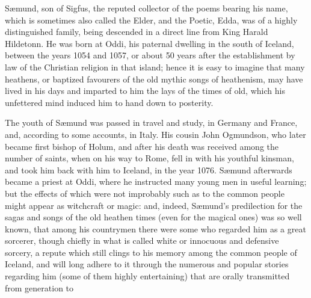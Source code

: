 

Sæmund, son of Sigfus, the reputed collector of the poems bearing his
name, which is sometimes also called the Elder, and the Poetic, Edda,
was of a highly distinguished family, being descended in a direct line
from King Harald Hildetonn. He was born at Oddi, his paternal dwelling
in the south of Iceland, between the years 1054 and 1057, or about 50
years after the establishment by law of the Christian religion in that
island; hence it is easy to imagine that many heathens, or baptized
favourers of the old mythic songs of heathenism, may have lived in his
days and imparted to him the lays of the times of old, which his
unfettered mind induced him to hand down to posterity.

The youth of Sæmund was passed in travel and study, in Germany and
France, and, according to some accounts, in Italy. His cousin John
Ogmundson, who later became first bishop of Holum, and after his death
was received among the number of saints, when on his way to Rome, fell
in with his youthful kinsman, and took him back with him to Iceland,
in the year 1076. Sæmund afterwards became a priest at Oddi, where he
instructed many young men in useful learning; but the effects of which
were not improbably such as to the common people might appear as
witchcraft or magic: and, indeed, Sæmund's predilection for the sagas
and songs of the old heathen times (even for the magical ones) was so
well known, that among his countrymen there were some who regarded him
as a great sorcerer, though chiefly in what is called white or
innocuous and defensive sorcery, a repute which still clings to his
memory among the common people of Iceland, and will long adhere to it
through the numerous and popular stories regarding him (some of them
highly entertaining) that are orally transmitted from generation to
